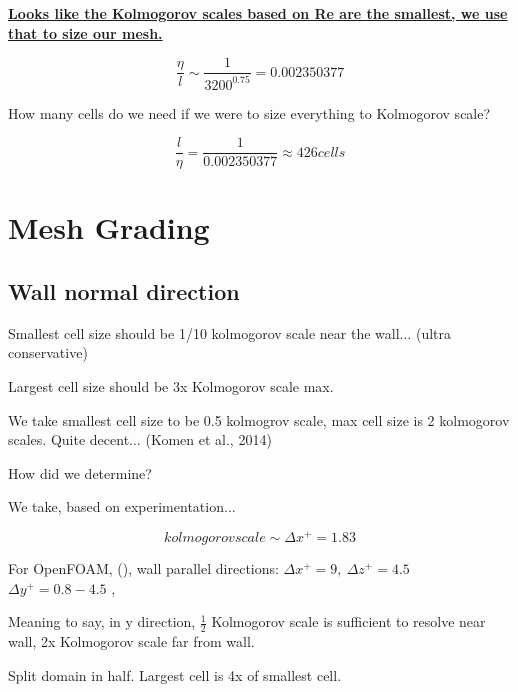 \documentclass[12pt]{article}
\renewcommand{\_}{\kern-1.5pt\textunderscore\kern-1.5pt}
\begin{document}
\textbf{\uline{Looks like the Kolmogorov scales based on Re are the smallest, we use that to size our mesh.}}\par

 \[ \frac{ \eta }{l} \sim \frac{1}{3200^{0.75}}=0.002350377 \] \par

How many cells do we need if we were to size everything to Kolmogorov scale?\par

 \[ \frac{l}{ \eta }=\frac{1}{0.002350377} \approx 426 cells \] \par

\section{Mesh Grading}
\subsection{Wall normal direction}\par

Smallest cell size should be 1/10 kolmogorov scale near the wall$ \ldots $  (ultra conservative)\par

Largest cell size should be 3x Kolmogorov scale max.\par

We take smallest cell size to be 0.5 kolmogrov scale, max cell size is 2 kolmogorov scales. Quite decent$ \ldots $  (Komen et al., 2014)\par

How did we determine?\par

We take, based on experimentation$ \ldots $ \par

 \[ kolmogorov scale  \sim   \Delta x^{+}=1.83 \] \par

For OpenFOAM, (\cite{Komen2014}), wall parallel directions: \(   \Delta x^{+}=9,~  \Delta z^{+}=4.5 \)   \(  \Delta y^{+}=0.8-4.5 \) , \par

Meaning to say, in y direction, $\frac{1}{2}$ Kolmogorov scale is sufficient to resolve near wall, 2x Kolmogorov scale far from wall.\par


\vspace{\baselineskip}

\vspace{\baselineskip}
Split domain in half. Largest cell is 4x of smallest cell.\par
\end{document}
